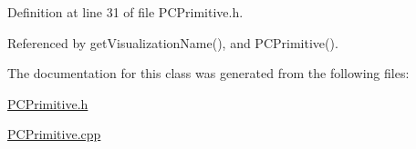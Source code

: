 Definition at line 31 of file P\-C\-Primitive.\-h.



Referenced by get\-Visualization\-Name(), and P\-C\-Primitive().



The documentation for this class was generated from the following files\-:\begin{DoxyCompactItemize}
\item 
\hyperlink{PCPrimitive_8h}{P\-C\-Primitive.\-h}\item 
\hyperlink{PCPrimitive_8cpp}{P\-C\-Primitive.\-cpp}\end{DoxyCompactItemize}
